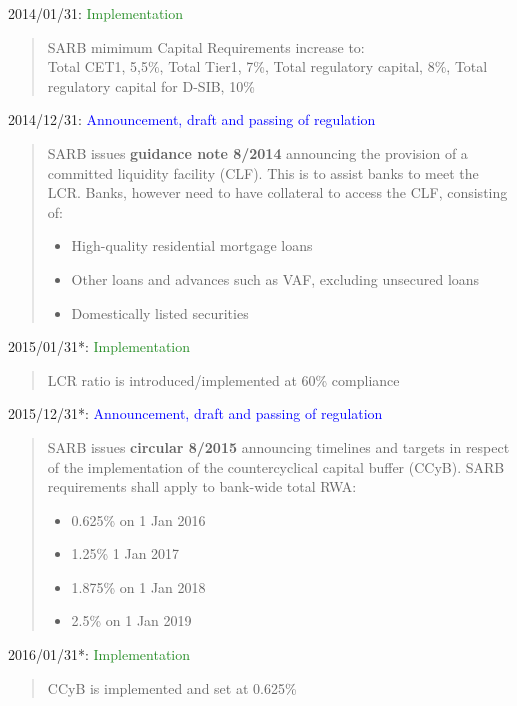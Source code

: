 \documentclass[
  letterpaper,
  DIV=11,
  numbers=noendperiod]{scrartcl}
\begin{document}
2014/01/31: \textcolor{ForestGreen}{Implementation}

\begin{quote}
SARB mimimum Capital Requirements increase to:\\
Total CET1, 5,5\%, Total Tier1, 7\%, Total regulatory capital, 8\%, Total regulatory capital for D-SIB, 10\%
\end{quote}

2014/12/31:
\textcolor{blue}{Announcement, draft and passing of regulation}

\begin{quote}
SARB issues \textbf{guidance note 8/2014} announcing  the provision of a committed liquidity facility  (CLF). This is to assist banks to meet the LCR.
Banks, however need to have collateral to access the CLF, consisting of:
\begin{itemize}
    \item  High-quality residential mortgage loans
\item Other loans and advances such as VAF, excluding unsecured loans
\item Domestically listed securities
\end{itemize}
\end{quote}

2015/01/31*: \textcolor{ForestGreen}{Implementation}

\begin{quote}
LCR ratio is introduced/implemented at 60\% compliance
\end{quote}

2015/12/31*:
\textcolor{blue}{Announcement, draft and passing of regulation}

\begin{quote}
SARB issues \textbf{circular 8/2015} announcing timelines and targets in respect of  the implementation of the countercyclical capital buffer (CCyB). SARB requirements shall apply to bank-wide total RWA:
\begin{itemize}
    \item 0.625\% on 1 Jan 2016
\item 1.25\% 1 Jan 2017
\item 1.875\% on 1 Jan 2018
\item 2.5\% on 1 Jan 2019
\end{itemize}
\end{quote}

2016/01/31*: \textcolor{ForestGreen}{Implementation}

\begin{quote}
CCyB is implemented and set at 0.625\%
\end{quote}
\end{document}
